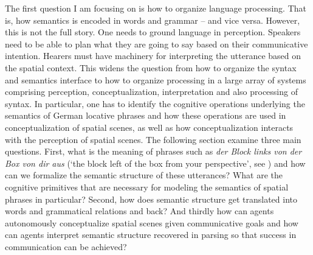 The first question I am focusing on is how to organize language processing.
That is, how semantics is encoded in words and grammar -- and vice versa.
However, this is not the full story. One needs to ground language in 
perception. Speakers need to be able to plan what they are going 
to say based on their communicative intention. Hearers must have machinery for
interpreting the utterance based on the spatial context. This widens the question
from how to organize the syntax and semantics interface to how to organize 
processing in a large array of systems comprising perception, conceptualization,
interpretation and also processing of syntax. In particular,
one has to identify the cognitive operations underlying the semantics of
German locative phrases and how these operations are used in conceptualization
of spatial scenes, as well as how conceptualization interacts with the
perception of spatial scenes.  The following section examine three main questions. 
First, what is the meaning of phrases such as
\textit{der Block links von der Box von dir aus} (`the block left of the box from your 
perspective', see ) and
how can we formalize the semantic structure of these utterances?
What are the cognitive primitives that are necessary for modeling the 
semantics of spatial phrases in particular? Second, how does semantic structure get translated into 
words and grammatical relations and back? And thirdly how can agents 
autonomously conceptualize spatial scenes given
communicative goals and how can agents interpret semantic structure recovered in parsing
so that success in communication can be achieved?

%
% 
%
